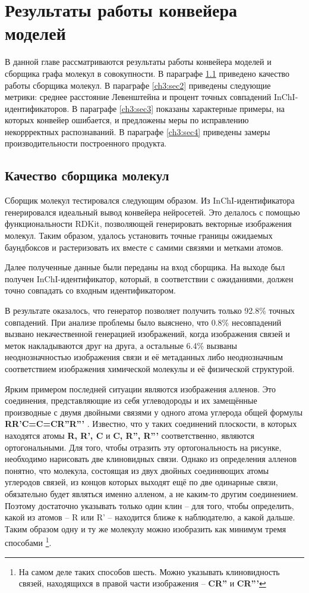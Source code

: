 \chapter{Результаты работы конвейера моделей} \label{ch3}

В данной главе рассматриваются результаты работы конвейера моделей и сборщика графа молекул в совокупности. В параграфе \ref{ch3:sec1} приведено качество работы сборщика молекул. В параграфе \ref{ch3:sec2} приведены следующие метрики: среднее расстояние Левенштейна и процент точных совпадений InChI-идентификаторов. В параграфе \ref{ch3:sec3} показаны характерные примеры, на которых конвейер ошибается, и предложены меры по исправлению некоррректных распознаваний. В параграфе \ref{ch3:sec4} приведены замеры производительности построенного продукта.

\section{Качество сборщика молекул} \label{ch3:sec1}

Сборщик молекул тестировался следующим образом. Из InChI-идентификатора генерировался идеальный вывод конвейера нейросетей. 
Это делалось с помощью функциональности RDKit, позволяющей генерировать векторные изображения молекул. Таким образом, удалось установить точные границы ожидаемых баундбоксов и растеризовать их вместе с самими связями и метками атомов.

Далее полученные данные были переданы на вход сборщика. На выходе был получен InChI-идентификатор, который, в соответствии с ожиданиями, должен точно совпадать со входным идентификатором.

В результате оказалось, что генератор позволяет получить только 92.8\% точных совпадений. При анализе проблемы было выяснено, что 0.8\% несовпадений вызвано некачественной генерацией изображений, когда изображения связей и меток накладываются друг на друга, а остальные 6.4\% вызваны неоднозначностью изображения связи и её метаданных либо неоднозначным соответствием изображения химической молекулы и её физической структурой.

Ярким примером последней ситуации являются изображения алленов. Это соединения, представляющие из себя углеводороды и их замещённые производные с двумя двойными связями у одного атома углерода общей формулы \textbf{RR'C=C=CR''R'''} \cite{allenes}. Известно, что у таких соединений плоскости, в которых находятся атомы \textbf{R, R', C} и \textbf{C, R'', R'''} соответственно, являются ортогональными. Для того, чтобы отразить эту ортогональность на рисунке, необходимо нарисовать две клиновидных связи. Однако из определения алленов понятно, что молекула, состоящая из двух двойных соединяющих атомы углеродов связей, из концов которых выходят ещё по две одинарные связи, обязательно будет являться именно алленом, а не каким-то другим соединением. Поэтому достаточно указывать только один клин -- для того, чтобы определить, какой из атомов -- R или R'  -- находится ближе к наблюдателю, а какой дальше. Таким образом одну и ту же молекулу можно изобразить как минимум тремя способами \footnote{На самом деле таких способов шесть. Можно указывать клиновидность связей, находящихся в правой части изображения -- \textbf{CR''} и \textbf{CR'''}}.

